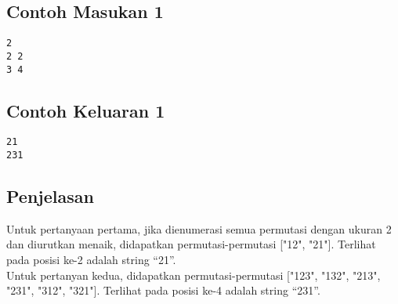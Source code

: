 \documentclass{article}
\begin{document}
\linebreak
\begin{multicols}{2}
\subsection*{Contoh Masukan 1}
\begin{lstlisting}
2
2 2
3 4

\end{lstlisting}
\null
\columnbreak
\subsection*{Contoh Keluaran 1}
\begin{lstlisting}
21
231

\end{lstlisting}
\vfill
\null
\end{multicols}

\subsection*{Penjelasan}

Untuk pertanyaan pertama, jika dienumerasi semua permutasi dengan ukuran 2 dan diurutkan menaik, didapatkan permutasi-permutasi ["12", "21"]. Terlihat pada posisi ke-2 adalah string “21”. \\

Untuk pertanyan kedua, didapatkan permutasi-permutasi ["123", "132", "213", "231", "312", "321"]. Terlihat pada posisi ke-4 adalah string “231”. \\
\end{document}
